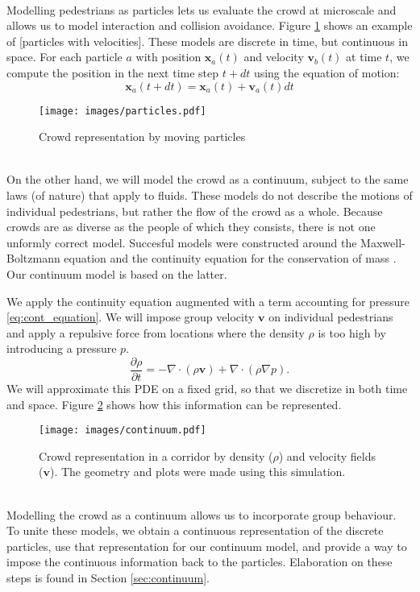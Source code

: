 \documentclass{article}
\renewcommand{\vec}[1]{\mathbf{#1}}
\begin{document}
\ \\
Modelling pedestrians as particles lets us evaluate the crowd at microscale and allows us to model interaction and collision avoidance.
Figure \ref{fig:particle_model} shows an example of [particles with velocities]. These models are discrete in time, but continuous in space. For each particle $a$ with position $\vec{x}_a(t)$ and velocity $\vec{v}_b(t)$ at time $t$, we compute the position in the next time step $t+dt$ using the equation of motion:
\begin{equation}
	\vec{x}_a(t+dt) = \vec{x}_a(t) + \vec{v}_a(t)dt
	\label{(t)}
\end{equation}
\begin{figure}[h!]
	\centering
	\texttt{[image: images/particles.pdf]}
	\caption{Crowd representation by moving particles}
	\label{fig:particle_model}
\end{figure}
\\
On the other hand, we will model the crowd as a continuum, subject to the same laws (of nature) that apply to fluids. 
These models do not describe the motions of individual pedestrians, but rather the flow of the crowd as a whole. Because crowds are as diverse as the people of which they consists, there is not one unformly correct model. Succesful models were constructed around the Maxwell-Boltzmann equation \cite{Henderson77} and the continuity equation for the conservation of mass \cite{Hoogendoorn15}.
Our continuum model is based on the latter. 

\newpage
We apply the continuity equation augmented with a term accounting for pressure \eqref{eq:cont_equation}. We will impose group velocity $\vec{v}$ on individual pedestrians and apply a repulsive force from locations where the density $\rho$ is too high by introducing a pressure $p$.
\begin{equation}
	\frac{\partial\rho}{\partial t} = - \nabla \cdot (\rho\vec{v})+\nabla\cdot(\rho\nabla p).
	\label{eq:cont_equation}
\end{equation}
We will approximate this PDE on a fixed grid, so that we discretize in both time and space. Figure \ref{fig:cont_illustration} shows how this information can be represented.
\begin{figure}[h!]
	\centering
	\texttt{[image: images/continuum.pdf]}
	\caption{Crowd representation in a corridor by density ($\rho$) and velocity fields ($\vec{v}$). The geometry and plots were made using this simulation.}
	\label{fig:cont_illustration}
\end{figure}
\\
Modelling the crowd as a continuum allows us to incorporate group behaviour.
\ \\
To unite these models, we obtain a continuous representation of the discrete particles, use that representation for our continuum model, and provide a way to impose the continuous information back to the particles. Elaboration on these steps is found in Section \ref{sec:continuum}.
\end{document}
